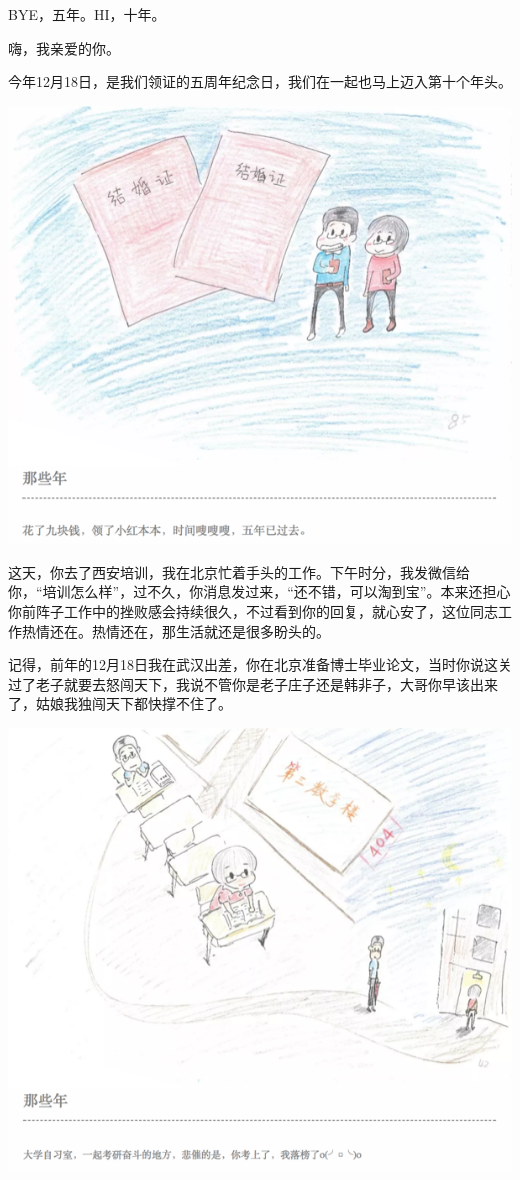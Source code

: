 \documentclass[
]{book}
\begin{document}
BYE，五年。HI，十年。

嗨，我亲爱的你。

今年12月18日，是我们领证的五周年纪念日，我们在一起也马上迈入第十个年头。

\includegraphics[width=8.33in]{images/wife1}

这天，你去了西安培训，我在北京忙着手头的工作。下午时分，我发微信给你，``培训怎么样''，过不久，你消息发过来，``还不错，可以淘到宝''。本来还担心你前阵子工作中的挫败感会持续很久，不过看到你的回复，就心安了，这位同志工作热情还在。热情还在，那生活就还是很多盼头的。

记得，前年的12月18日我在武汉出差，你在北京准备博士毕业论文，当时你说这关过了老子就要去怒闯天下，我说不管你是老子庄子还是韩非子，大哥你早该出来了，姑娘我独闯天下都快撑不住了。

\includegraphics[width=8.33in]{images/wife2}
\end{document}
